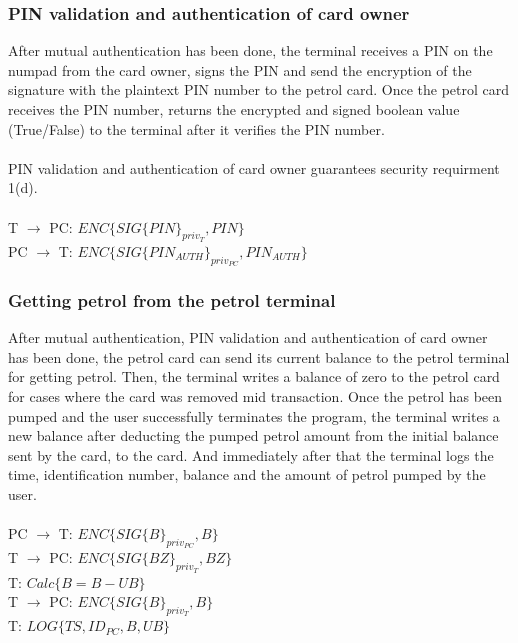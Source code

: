 \subsubsection{PIN validation and authentication of card owner}
After mutual authentication has been done, the terminal receives a PIN on the numpad from the card owner, signs the PIN and send the encryption of the signature with the plaintext PIN number to the petrol card. Once the petrol card receives the PIN number, returns the encrypted and signed boolean value (True/False) to the terminal after it verifies the PIN number.
\\
\\
PIN validation and authentication of card owner guarantees security requirment 1(d).
\\
\\
T $\to$ PC: $ENC\{SIG\{PIN\}_{priv_T}, PIN\}$\\
PC $\to$ T: $ENC\{SIG\{PIN_{AUTH}\}_{priv_{PC}}, PIN_{AUTH}\}$

\subsubsection{Getting petrol from the petrol terminal}
After mutual authentication, PIN validation and authentication of card owner has been done, the petrol card can send its current balance to the petrol terminal for getting petrol. Then, the terminal writes a balance of zero to the petrol card for cases where the card was removed mid transaction. Once the petrol has been pumped and the user successfully terminates the program, the terminal writes a new balance after deducting the pumped petrol amount from the initial balance sent by the card, to the card. And immediately after that the terminal logs the time, identification number, balance and the amount of petrol pumped by the user.
\\
\\
PC $\to$ T: $ENC\{SIG\{B\}_{priv_{PC}}, B\}$\\
T $\to$ PC: $ENC\{SIG\{BZ\}_{priv_T}, BZ\}$\\
T: $Calc\{B = B - UB\}$\\
T $\to$ PC: $ENC\{SIG\{B\}_{priv_T}, B\}$\\
T: $LOG\{TS, ID_{PC}, B, UB\}$

